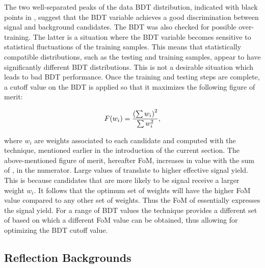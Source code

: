 The two well-separated peaks of the data BDT distribution, indicated with black points in , suggest
that the BDT variable achieves a good discrimination between signal and background candidates.
The BDT was also checked for possible over-training. The latter is a situation where the BDT variable becomes sensitive
to statistical fluctuations of the training samples. This means that statistically compatible distributions, such as
the testing and training samples, appear to have significantly different BDT distributions. This is not a desirable
situation which leads to bad BDT performance. Once the training and testing steps are complete, a cutoff value on the
BDT is applied so that it maximizes the following figure of merit:

\begin{equation}
  \centering
  F(w_i) = \frac{\left(\sum{w_{i}}\right)^2}{\sum{w_{i}^2}},
\label{eqn:fom}
\end{equation}

\noindent where $w_i$ are weights associated to each candidate and computed with the \sPlot technique,
mentioned earlier in the introduction of the current section. The above-mentioned figure of merit, hereafter FoM, increases in value with
the sum of \sWeights, in the numerator. Large values of \sWeights translate to higher effective signal yield.
This is because candidates that are more likely to be signal receive a larger weight $w_i$. It follows that the
optimum set of weights will have the higher FoM value compared to any other set of weights. Thus the FoM
of  essentially expresses the signal yield. For a range of BDT values the \sPlot technique
provides a different set of \sWeights based on which a different FoM value can be obtained, thus allowing for
optimizing the BDT cutoff value.

\subsection{Reflection Backgrounds}
\label{peaking_backgrounds}

